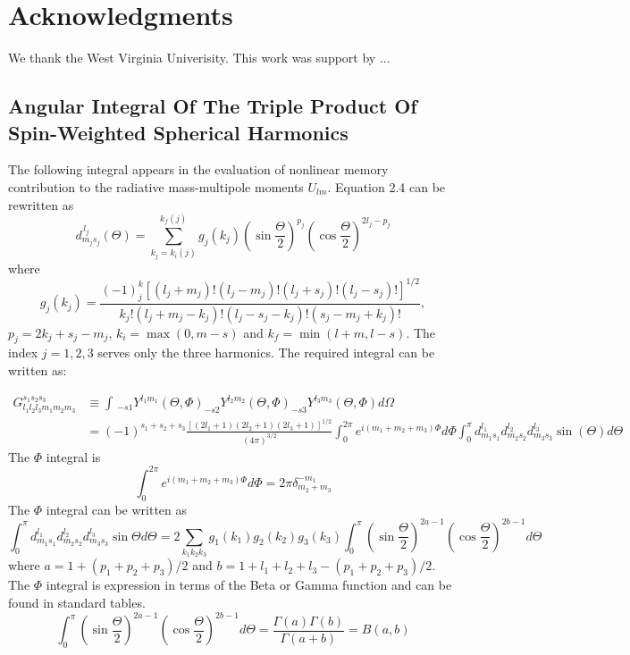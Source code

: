 \documentclass[twocolumn,showpacs,aps,prd,nobibnotes,floatfix]{revtex4-1}
\begin{document}
\section{Acknowledgments}
We thank the West Virginia Univerisity. This work was support by ... 

\newpage
\appendix 
\begin{widetext}

\section{Angular Integral Of The Triple Product Of Spin-Weighted Spherical Harmonics}\label{Appendix A}
The following integral appears in the evaluation of nonlinear memory contribution to the radiative mass-multipole moments $U_{lm}$. Equation 2.4 can be rewritten as
\begin{equation}
	d^{\,l_j}_{m_js_j}(\Theta)=\sum_{k_j=k_i(j)}^{k_f(j)}g_j(k_j)\left(\sin\frac{\Theta}{2}\right)^{p_j}\left(\cos\frac{\Theta}{2}\right)^{2l_j-p_j}
\end{equation}
where
\begin{equation}
	g_j(k_j)=\frac{(-1)^k_j[(l_j + m_j)!(l_j-m_j)!(l_j+s_j)!(l_j-s_j)!]^{1/2}}{k_j!(l_j+m_j-k_j)!(l_j-s_j-k_j)!(s_j-m_j+k_j)!},
\end{equation}
$p_j=2k_j+s_j-m_j$, $k_i=\max(0, m-s)$ and $k_f=\min(l+m, l-s)$. The index $j=1,2,3$ serves only the three harmonics. The required integral can be written as:

\begin{align}
	G^{s_1 s_2 s_3}_{l_1 l_2 l_3 m_1 m_2 m_3}&\equiv\int\, _{-s1}Y^{l_1m_1}(\Theta, \Phi)_{-s2}Y^{l_2m_2}(\Theta, \Phi)_{-s3}Y^{l_3m_3}(\Theta, \Phi)d\Omega \nonumber \\
	&=(-1)^{s_1+s_2+s_3}\frac{[(2l_1+1)(2l_2+1)(2l_3+1)]^{1/2}}{(4\pi)^{3/2}}\int_{0}^{2\pi}e^{\mathit{i}(m_1+m_2+m_3)\Phi}d\Phi\int_{0}^{\pi}d^{l_1}_{m_1s_1}d^{l_2}_{m_2s_2}d^{l_3}_{m_3s_3}\sin(\Theta)d\Theta
\end{align}
The $\Phi$ integral is 
\begin{equation}
	\int_{0}^{2\pi}e^{\mathit{i}(m_1+m_2+m_3)\Phi}d\Phi = 2\pi\delta^{-m_1}_{m_2+m_3}
\end{equation}
The $\Phi$ integral can be written as 
\begin{equation}
	\int_{0}^{\pi}d^{l_1}_{m_1s_1}d^{l_2}_{m_2s_2}d^{l_3}_{m_3s_3}\sin\Theta d\Theta = 2\sum_{k_1k_2k_3}g_1(k_1)g_2(k_2)g_3(k_3)\int_{0}^{\pi}\left(\sin\frac{\Theta}{2}\right)^{2a-1}\left(\cos\frac{\Theta}{2}\right)^{2b-1}d\Theta
\end{equation}
where $a=1+(p_1+p_2+p_3)/2$ and $b=1+l_1+l_2+l_3-(p_1+p_2+p_3)/2$. The $\Phi$ integral is expression in terms of the Beta or Gamma function and can be found in standard tables.
\begin{equation}
	\int_{0}^{\pi}\left(\sin\frac{\Theta}{2}\right)^{2a-1}\left(\cos\frac{\Theta}{2}\right)^{2b-1}d\Theta=\frac{\Gamma(a)\Gamma(b)}{\Gamma(a+b)}=B(a,b)
\end{equation}


\end{widetext}
\end{document}
